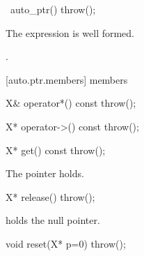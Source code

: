 %
\begin{itemdecl}
~auto_ptr() throw();
\end{itemdecl}

\begin{itemdescr}
\pnum
\requires
The expression  is well formed.

\pnum
\effects
{}.
\end{itemdescr}

[auto.ptr.members]{ members}

%
\begin{itemdecl}
X& operator*() const throw();
\end{itemdecl}

\begin{itemdescr}
\pnum
\requires
{}

\pnum
\returns
{}
\end{itemdescr}

%
\begin{itemdecl}
X* operator->() const throw();
\end{itemdecl}

\begin{itemdescr}
\pnum
\returns
{}
\end{itemdescr}

%
\begin{itemdecl}
X* get() const throw();
\end{itemdecl}

\begin{itemdescr}
\pnum
\returns
The pointer  holds.
\end{itemdescr}

%
\begin{itemdecl}
X* release() throw();
\end{itemdecl}

\begin{itemdescr}
\pnum
\returns
{}

\pnum
\postcondition
{} holds the null pointer.
\end{itemdescr}

%
\begin{itemdecl}
void reset(X* p=0) throw();
\end{itemdecl}

